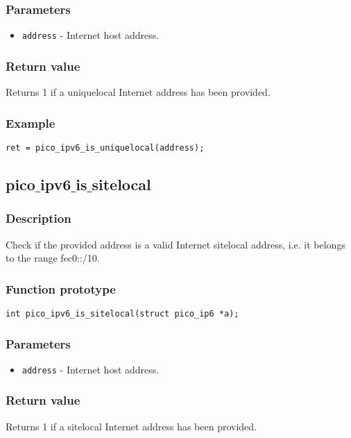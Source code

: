 \subsubsection*{Parameters}
\begin{itemize}[noitemsep]
\item \texttt{address} - Internet host address.
\end{itemize}

\subsubsection*{Return value}
Returns 1 if a uniquelocal Internet address has been provided.


\subsubsection*{Example}
\begin{verbatim}
ret = pico_ipv6_is_uniquelocal(address);
\end{verbatim}

\subsection{pico$\_$ipv6$\_$is$\_$sitelocal}
\subsubsection*{Description}
Check if the provided address is a valid Internet sitelocal address, i.e. it belongs to the range fec0::/10.
\subsubsection*{Function prototype}
\begin{verbatim}
int pico_ipv6_is_sitelocal(struct pico_ip6 *a);
\end{verbatim}
\subsubsection*{Parameters}
\begin{itemize}[noitemsep]
\item \texttt{address} - Internet host address.
\end{itemize}
\subsubsection*{Return value}
Returns 1 if a sitelocal Internet address has been provided.
